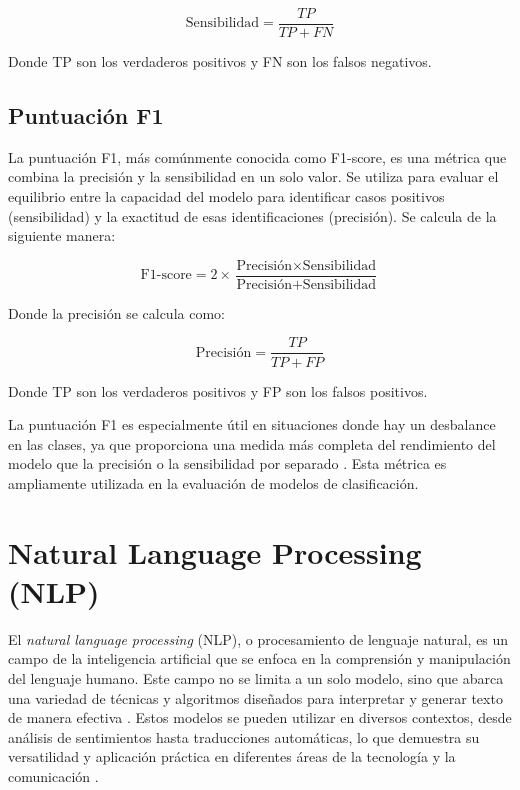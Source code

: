 \begin{equation}
    \text{Sensibilidad} = \frac{TP}{TP + FN}
\end{equation}

Donde TP son los verdaderos positivos y FN son los falsos negativos.

\subsection{Puntuación F1}
La puntuación F1, más comúnmente conocida como F1-score, es una métrica que combina la precisión y la sensibilidad en un solo valor. 
Se utiliza para evaluar el equilibrio entre la capacidad del modelo para identificar casos positivos (sensibilidad) y la exactitud de esas identificaciones (precisión). 
Se calcula de la siguiente manera:

\begin{equation}
    \text{F1-score} = 2 \times \frac{\text{Precisión} \times \text{Sensibilidad}}{\text{Precisión} + \text{Sensibilidad}}
\end{equation}

Donde la precisión se calcula como:

\begin{equation}
    \text{Precisión} = \frac{TP}{TP + FP}
\end{equation}

Donde TP son los verdaderos positivos y FP son los falsos positivos.

La puntuación F1 es especialmente útil en situaciones donde hay un desbalance en las clases, ya que proporciona una medida más completa del rendimiento del modelo que la precisión o la sensibilidad por separado \cite{f1score}.
Esta métrica es ampliamente utilizada en la evaluación de modelos de clasificación.




\section{Natural Language Processing (NLP)}

El \textit{natural language processing} (NLP), o procesamiento de lenguaje natural, es un campo de la inteligencia artificial que se enfoca en la comprensión y manipulación del lenguaje humano. Este campo no se limita a un solo modelo, sino que abarca una variedad de técnicas y algoritmos diseñados para interpretar y generar texto de manera efectiva \cite{fifteen}. Estos modelos se pueden utilizar en diversos contextos, desde análisis de sentimientos hasta traducciones automáticas, lo que demuestra su versatilidad y aplicación práctica en diferentes áreas de la tecnología y la comunicación \cite{sixteen}.



